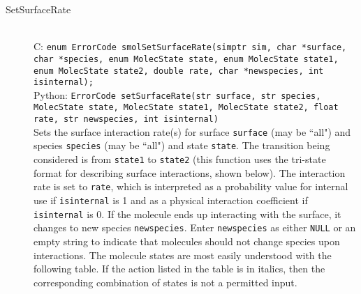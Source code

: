 \documentclass {book}
\begin{document}
\begin{description}
\item[SetSurfaceRate]
\hfill \\
C: \texttt{enum ErrorCode smolSetSurfaceRate(simptr sim, char *surface, char *species, enum MolecState state, enum MolecState state1, enum MolecState state2, double rate, char *newspecies, int isinternal);}\\
Python: \texttt{ErrorCode setSurfaceRate(str surface, str species, MolecState state, MolecState state1, MolecState state2, float rate, str newspecies, int isinternal)}\\
Sets the surface interaction rate(s) for surface \texttt{surface} (may be ``all") and species \texttt{species} (may be ``all") and state \texttt{state}. The transition being considered is from \texttt{state1} to \texttt{state2} (this function uses the tri-state format for describing surface interactions, shown below). The interaction rate is set to \texttt{rate}, which is interpreted as a probability value for internal use if \texttt{isinternal} is 1 and as a physical interaction coefficient if \texttt{isinternal} is 0. If the molecule ends up interacting with the surface, it changes to new species \texttt{newspecies}. Enter \texttt{newspecies} as either \texttt{NULL} or an empty string to indicate that molecules should not change species upon interactions. The molecule states are most easily understood with the following table. If the action listed in the table is in italics, then the corresponding combination of states is not a permitted input.


\end{description}
\end{document}

